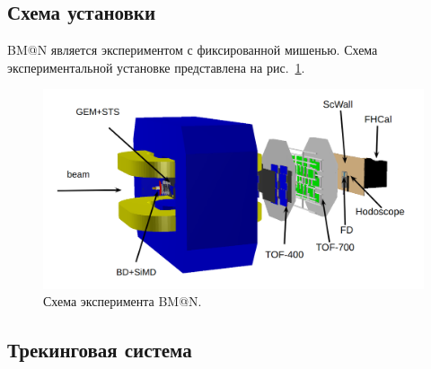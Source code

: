 \subsection{Схема установки}

BM@N является экспериментом с фиксированной мишенью.
Схема экспериментальной установке представлена на рис.~\ref{fig:bmn_layout}.
%
\begin{figure}[ht]
\begin{center}
\includegraphics[width=0.95\linewidth]{images/BM@N_layout.png}
\caption{Схема эксперимента BM@N.}
\label{fig:bmn_layout}
\end{center}
\end{figure}

\subsection{Трекинговая система}

